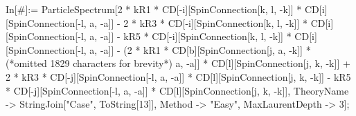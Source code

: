 In[#]:= ParticleSpectrum[2 * kR1 * CD[-i][SpinConnection[k, l, -k]] * CD[i][SpinConnection[-l, a, -a]] - 2 * kR3 * CD[-i][SpinConnection[k, l, -k]] * CD[i][SpinConnection[-l, a, -a]] - kR5 * CD[-i][SpinConnection[k, l, -k]] * CD[i][SpinConnection[-l, a, -a]] - (2 * kR1 * CD[b][SpinConnection[j, a, -k]] * (*omitted 1829 characters for brevity*) a, -a]] * CD[l][SpinConnection[j, k, -k]] + 2 * kR3 * CD[-j][SpinConnection[-l, a, -a]] * CD[l][SpinConnection[j, k, -k]] - kR5 * CD[-j][SpinConnection[-l, a, -a]] * CD[l][SpinConnection[j, k, -k]], TheoryName -> StringJoin["Case", ToString[13]], Method -> "Easy", MaxLaurentDepth -> 3];